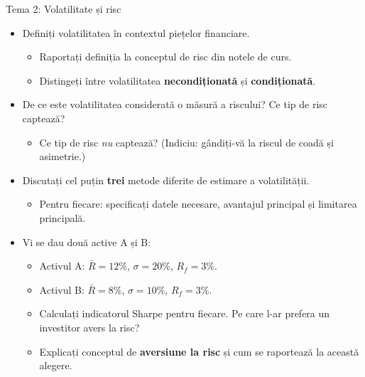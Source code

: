 \documentclass[9pt, aspectratio=169, t]{beamer}
\theoremstyle{definition}
\begin{document}
\begin{frame}{Tema 2: Volatilitate și risc}
\begin{itemize}
    \item Definiți volatilitatea în contextul piețelor financiare.
    \begin{itemize}
        \item Raportați definiția la conceptul de risc din notele de curs.
        \item Distingeți între volatilitatea \textbf{necondiționată} și \textbf{condiționată}.
    \end{itemize}
    \item De ce este volatilitatea considerată o măsură a riscului? Ce tip de risc captează?
    \begin{itemize}
        \item Ce tip de risc \textit{nu} captează? (Indiciu: gândiți-vă la riscul de coadă și asimetrie.)
    \end{itemize}
    \item Discutați cel puțin \textbf{trei} metode diferite de estimare a volatilității.
    \begin{itemize}
        \item Pentru fiecare: specificați datele necesare, avantajul principal și limitarea principală.
    \end{itemize}
    \item Vi se dau două active A și B:
    \begin{itemize}
        \item Activul A: $\bar{R} = 12\%$, $\sigma = 20\%$, $R_f = 3\%$.
        \item Activul B: $\bar{R} = 8\%$, $\sigma = 10\%$, $R_f = 3\%$.
        \item Calculați indicatorul Sharpe pentru fiecare. Pe care l-ar prefera un investitor avers la risc?
        \item Explicați conceptul de \textbf{aversiune la risc} și cum se raportează la această alegere.
    \end{itemize}
\end{itemize}
\end{frame}
\end{document}
